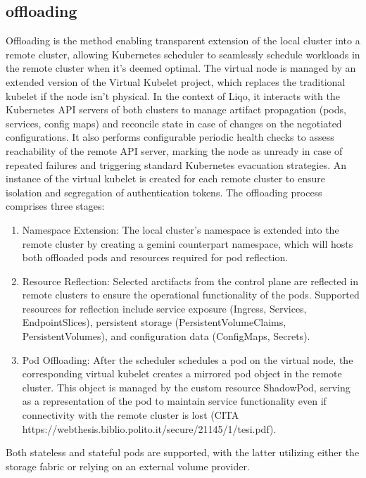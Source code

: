 \subsection{offloading}
Offloading is the method enabling transparent extension of the local cluster into a remote cluster, allowing Kubernetes scheduler to seamlessly schedule workloads in the remote cluster when it's deemed optimal. The virtual node is managed by an extended version of the Virtual Kubelet project, which replaces the traditional kubelet if the node isn't physical. In the context of Liqo, it interacts with the Kubernetes API servers of both clusters to manage artifact propagation (pods, services, config maps) and reconcile state in case of changes on the negotiated configurations. It also performs configurable periodic health checks to assess reachability of the remote API server, marking the node as unready in case of repeated failures and triggering standard Kubernetes evacuation strategies. An instance of the virtual kubelet is created for each remote cluster to ensure isolation and segregation of authentication tokens.
The offloading process comprises three stages:
\begin{enumerate}
\item Namespace Extension: The local cluster's namespace is extended into the remote cluster by creating a gemini counterpart namespace, which will hosts both offloaded pods and resources required for pod reflection.
\item Resource Reflection: Selected arctifacts from the control plane are reflected in remote clusters to ensure the operational functionality of the pods. Supported resources for reflection include service exposure (Ingress, Services, EndpointSlices), persistent storage (PersistentVolumeClaims, PersistentVolumes), and configuration data (ConfigMaps, Secrets).
\item Pod Offloading: After the scheduler schedules a pod on the virtual node, the corresponding virtual kubelet creates a mirrored pod object in the remote cluster. This object is managed by the custom resource ShadowPod, serving as a representation of the pod to maintain service functionality even if connectivity with the remote cluster is lost (CITA https://webthesis.biblio.polito.it/secure/21145/1/tesi.pdf).
\end{enumerate}
Both stateless and stateful pods are supported, with the latter utilizing either the storage fabric or relying on an external volume provider.

